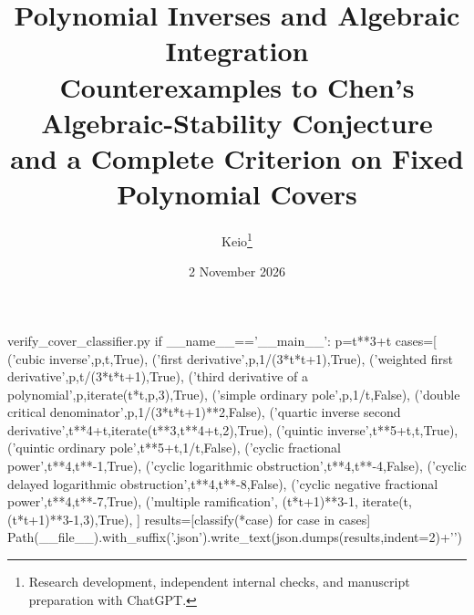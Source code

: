 \begin{filecontents*}[overwrite]{verify_cover_classifier.py}
if __name__=='__main__':
    p=t**3+t
    cases=[
        ('cubic inverse',p,t,True),
        ('first derivative',p,1/(3*t*t+1),True),
        ('weighted first derivative',p,t/(3*t*t+1),True),
        ('third derivative of a polynomial',p,iterate(t*t,p,3),True),
        ('simple ordinary pole',p,1/t,False),
        ('double critical denominator',p,1/(3*t*t+1)**2,False),
        ('quartic inverse second derivative',t**4+t,iterate(t**3,t**4+t,2),True),
        ('quintic inverse',t**5+t,t,True),
        ('quintic ordinary pole',t**5+t,1/t,False),
        ('cyclic fractional power',t**4,t**-1,True),
        ('cyclic logarithmic obstruction',t**4,t**-4,False),
        ('cyclic delayed logarithmic obstruction',t**4,t**-8,False),
        ('cyclic negative fractional power',t**4,t**-7,True),
        ('multiple ramification', (t*t+1)**3-1,
         iterate(t,(t*t+1)**3-1,3),True),
    ]
    results=[classify(*case) for case in cases]
    Path(__file__).with_suffix('.json').write_text(json.dumps(results,indent=2)+'\n')
\end{filecontents*}
\documentclass[11pt,a4paper]{article}
\usepackage[margin=25mm]{geometry}
\usepackage[T1]{fontenc}
\usepackage{lmodern,amsmath,amssymb,amsthm,mathtools,booktabs,array}
\usepackage{xcolor,microtype,fancyhdr}
\usepackage[colorlinks=true,linkcolor=blue!45!black,urlcolor=blue!45!black,citecolor=blue!45!black]{hyperref}
\newtheorem{theorem}{Theorem}[section]
\newtheorem{lemma}[theorem]{Lemma}
\newtheorem{proposition}[theorem]{Proposition}
\newtheorem{corollary}[theorem]{Corollary}
\theoremstyle{remark}\newtheorem{remark}[theorem]{Remark}
\setlength{\emergencystretch}{3em}
\setlength{\headheight}{14pt}
\pagestyle{fancy}\fancyhf{}
\fancyfoot[C]{\thepage}
\title{Polynomial Inverses and Algebraic Integration\\[5pt]
\large Counterexamples to Chen's Algebraic-Stability Conjecture\\
and a Complete Criterion on Fixed Polynomial Covers}
\author{Keio\thanks{Research development, independent internal checks, and manuscript preparation with ChatGPT.}}
\date{2 November 2026}

